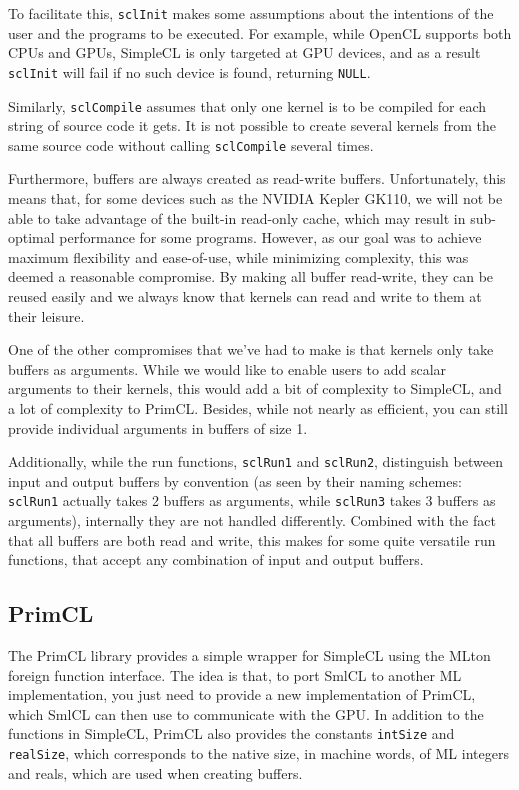 To facilitate this, \texttt{sclInit} makes some assumptions about the
intentions of the user and the programs to be executed. For example,
while OpenCL supports both CPUs and GPUs, SimpleCL is only targeted at
GPU devices, and as a result \texttt{sclInit} will fail if no such
device is found, returning \texttt{NULL}.

Similarly, \texttt{sclCompile} assumes that only one kernel is to be
compiled for each string of source code it gets. It is not possible to
create several kernels from the same source code without calling
\texttt{sclCompile} several times.

Furthermore, buffers are always created as read-write
buffers. Unfortunately, this means that, for some devices such as the
NVIDIA Kepler GK110, we will not be able to take advantage of the
built-in read-only cache, which may result in sub-optimal performance
for some programs. However, as our goal was to achieve maximum
flexibility and ease-of-use, while minimizing complexity, this was
deemed a reasonable compromise. By making all buffer read-write, they
can be reused easily and we always know that kernels can read and
write to them at their leisure.

One of the other compromises that we've had to make is that kernels
only take buffers as arguments. While we would like to enable users to
add scalar arguments to their kernels, this would add a bit of
complexity to SimpleCL, and a lot of complexity to PrimCL. Besides,
while not nearly as efficient, you can still provide individual
arguments in buffers of size 1.

Additionally, while the run functions, \texttt{sclRun1} and
\texttt{sclRun2}, distinguish between input and output buffers by
convention (as seen by their naming schemes: \texttt{sclRun1} actually
takes 2 buffers as arguments, while \texttt{sclRun3} takes 3 buffers
as arguments), internally they are not handled differently. Combined
with the fact that all buffers are both read and write, this makes for
some quite versatile run functions, that accept any combination of
input and output buffers.

\subsection{PrimCL}

The PrimCL library provides a simple wrapper for SimpleCL using the
MLton foreign function interface. The idea is that, to port SmlCL to
another ML implementation, you just need to provide a new
implementation of PrimCL, which SmlCL can then use to communicate with
the GPU. In addition to the functions in SimpleCL, PrimCL also
provides the constants \texttt{intSize} and \texttt{realSize}, which
corresponds to the native size, in machine words, of ML integers and
reals, which are used when creating buffers.

